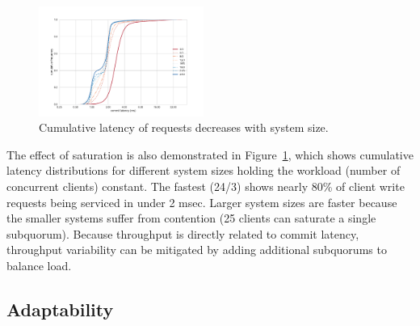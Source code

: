 \documentclass[10pt,conference]{IEEEtran}
\begin{document}
\begin{figure}
    \centering
    \includegraphics[width=0.48\textwidth]{figures/ec2_latency_cumfreq.pdf}
    \caption{Cumulative latency of requests decreases with system size.}
    \label{fig:latency}
\end{figure}

The effect of saturation is also demonstrated in Figure~\ref{fig:latency}, which shows
cumulative latency distributions for different system sizes holding the workload
(number of concurrent clients) constant.
The fastest (24/3) shows nearly 80\% of client write requests being serviced in under
2 msec.
Larger system sizes are faster because the smaller systems suffer from contention (25
clients can saturate a single subquorum).
Because throughput is directly related to commit latency, throughput variability can be
mitigated by adding additional subquorums to balance load.

\subsection{Adaptability}
\label{section:adaptability}
\end{document}
